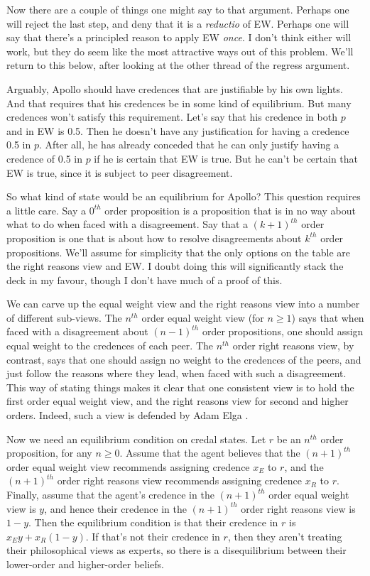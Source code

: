 Now there are a couple of things one might say to that argument. Perhaps one will reject the last step, and deny that it is a \textit{reductio} of EW. Perhaps one will say that there's a principled reason to apply EW \textit{once}. I don't think either will work, but they do seem like the most attractive ways out of this problem. We'll return to this below, after looking at the other thread of the regress argument.

Arguably, Apollo should have credences that are justifiable by his own lights. And that requires that his credences be in some kind of equilibrium. But many credences won't satisfy this requirement. Let's say that his credence in both $p$ and in EW is 0.5. Then he doesn't have any justification for having a credence 0.5 in $p$. After all, he has already conceded that he can only justify having a credence of 0.5 in $p$ if he is certain that EW is true. But he can't be certain that EW is true, since it is subject to peer disagreement.

So what kind of state would be an equilibrium for Apollo? This question requires a little care. Say a $0^{th}$ order proposition is a proposition that is in no way about what to do when faced with a disagreement. Say that a $(k+1)^{th}$ order proposition is one that is about how to resolve disagreements about $k^{th}$ order propositions. We'll assume for simplicity that the only options on the table are the right reasons view and EW. I doubt doing this will significantly stack the deck in my favour, though I don't have much of a proof of this. 

We can carve up the equal weight view and the right reasons view into a number of different sub-views. The $n^{th}$ order equal weight view (for $n \geq 1$) says that when faced with a disagreement about $(n-1)^{th}$ order propositions, one should assign equal weight to the credences of each peer. The $n^{th}$ order right reasons view, by contrast, says that one should assign no weight to the credences of the peers, and just follow the reasons where they lead, when faced with such a disagreement. This way of stating things makes it clear that one consistent view is to hold the first order equal weight view, and the right reasons view for second and higher orders. Indeed, such a view is defended by Adam Elga \citeyearpar{Elga2010-ELGHTD}.

Now we need an equilibrium condition on credal states. Let $r$ be an $n^{th}$ order proposition, for any $n \geq 0$. Assume that the agent believes that the $(n+1)^{th}$ order equal weight view recommends assigning credence $x_E$ to $r$, and the $(n+1)^{th}$ order right reasons view recommends assigning credence $x_R$ to $r$. Finally, assume that the agent's credence in the $(n+1)^{th}$ order equal weight view is $y$, and hence their credence in the $(n+1)^{th}$ order right reasons view is $1-y$. Then the equilibrium condition is that their credence in $r$ is $x_Ey + x_R(1-y)$. If that's not their credence in $r$, then they aren't treating their philosophical views as experts, so there is a disequilibrium between their lower-order and higher-order beliefs.

